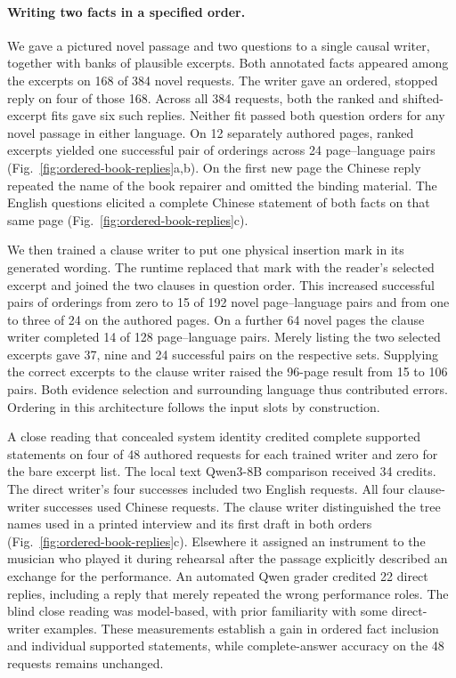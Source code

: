 \paragraph{Writing two facts in a specified order.}
We gave a pictured novel passage and two questions to a single causal writer, together with banks of plausible excerpts. Both annotated facts appeared among the excerpts on 168 of 384 novel requests. The writer gave an ordered, stopped reply on four of those 168. Across all 384 requests, both the ranked and shifted-excerpt fits gave six such replies. Neither fit passed both question orders for any novel passage in either language. On 12 separately authored pages, ranked excerpts yielded one successful pair of orderings across 24 page--language pairs (Fig.~\ref{fig:ordered-book-replies}a,b). On the first new page the Chinese reply repeated the name of the book repairer and omitted the binding material. The English questions elicited a complete Chinese statement of both facts on that same page (Fig.~\ref{fig:ordered-book-replies}c).

We then trained a clause writer to put one physical insertion mark in its generated wording. The runtime replaced that mark with the reader's selected excerpt and joined the two clauses in question order. This increased successful pairs of orderings from zero to 15 of 192 novel page--language pairs and from one to three of 24 on the authored pages. On a further 64 novel pages the clause writer completed 14 of 128 page--language pairs. Merely listing the two selected excerpts gave 37, nine and 24 successful pairs on the respective sets. Supplying the correct excerpts to the clause writer raised the 96-page result from 15 to 106 pairs. Both evidence selection and surrounding language thus contributed errors. Ordering in this architecture follows the input slots by construction.

A close reading that concealed system identity credited complete supported statements on four of 48 authored requests for each trained writer and zero for the bare excerpt list. The local text Qwen3-8B comparison received 34 credits. The direct writer's four successes included two English requests. All four clause-writer successes used Chinese requests. The clause writer distinguished the tree names used in a printed interview and its first draft in both orders (Fig.~\ref{fig:ordered-book-replies}c). Elsewhere it assigned an instrument to the musician who played it during rehearsal after the passage explicitly described an exchange for the performance. An automated Qwen grader credited 22 direct replies, including a reply that merely repeated the wrong performance roles. The blind close reading was model-based, with prior familiarity with some direct-writer examples. These measurements establish a gain in ordered fact inclusion and individual supported statements, while complete-answer accuracy on the 48 requests remains unchanged.
